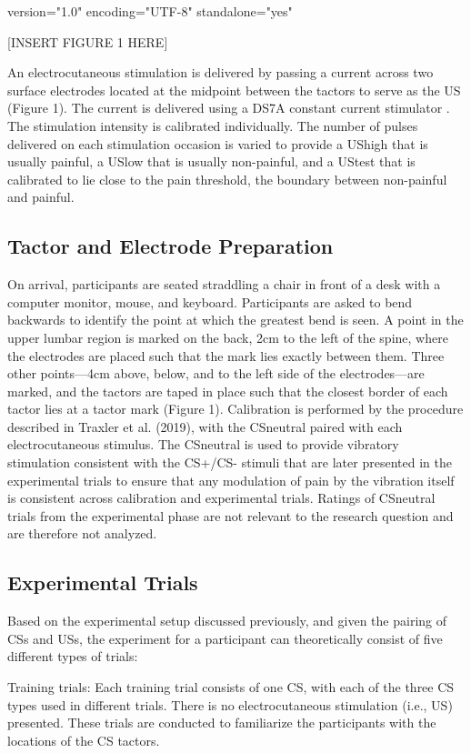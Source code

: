 version="1.0" encoding="UTF-8" standalone="yes" \documentclass{article}
\begin{document}
[INSERT FIGURE 1 HERE]

An electrocutaneous stimulation is delivered by passing a current across two surface electrodes located at the midpoint between the tactors to serve as the US (Figure 1). The current is delivered using a DS7A constant current stimulator \autocite{bib(DigitimerLimitedn.d.)}. The stimulation intensity is calibrated individually. The number of pulses delivered on each stimulation occasion is varied to provide a UShigh that is usually painful, a USlow that is usually non-painful, and a UStest that is calibrated to lie close to the pain threshold, the boundary between non-painful and painful.

\subsection{Tactor and Electrode Preparation}

On arrival, participants are seated straddling a chair in front of a desk with a computer monitor, mouse, and keyboard. Participants are asked to bend backwards to identify the point at which the greatest bend is seen. A point in the upper lumbar region is marked on the back, 2cm to the left of the spine, where the electrodes are placed such that the mark lies exactly between them. Three other points—4cm above, below, and to the left side of the electrodes—are marked, and the tactors are taped in place such that the closest border of each tactor lies at a tactor mark (Figure 1). Calibration is performed by the procedure described in Traxler et al. (2019), with the CSneutral paired with each electrocutaneous stimulus. The CSneutral is used to provide vibratory stimulation consistent with the CS+/CS- stimuli that are later presented in the experimental trials to ensure that any modulation of pain by the vibration itself is consistent across calibration and experimental trials. Ratings of CSneutral trials from the experimental phase are not relevant to the research question and are therefore not analyzed.

\subsection{Experimental Trials}

Based on the experimental setup discussed previously, and given the pairing of CSs and USs, the experiment for a participant can theoretically consist of five different types of trials:

Training trials: Each training trial consists of one CS, with each of the three CS types used in different trials. There is no electrocutaneous stimulation (i.e., US) presented. These trials are conducted to familiarize the participants with the locations of the CS tactors. 
\end{document}
